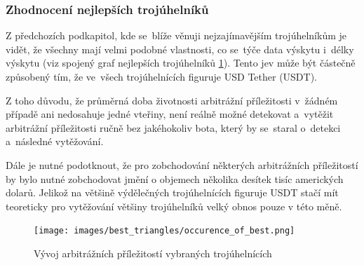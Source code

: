 \documentclass[thesis=B,czech]{FITthesis}[2019/03/21]
\begin{document}
\subsubsection{Zhodnocení nejlepších trojúhelníků}
Z předchozích podkapitol, kde se~blíže věnuji nejzajímavějším trojúhelníkům je vidět, že všechny mají velmi podobné vlastnosti, co se~týče data výskytu i~délky výskytu (viz spojený graf nejlepších trojúhelníků \ref{occurence_of_best}). Tento jev může být částečně způsobený tím, že ve~všech trojúhelnících figuruje USD Tether (USDT). 

Z toho důvodu, že průměrná doba životnosti arbitrážní příležitosti \linebreak v~žádném případě ani nedosahuje jedné vteřiny, není reálně možné detekovat a~vytěžit arbitrážní příležitosti ručně bez jakéhokoliv bota, který by se~staral o~detekci a~následné vytěžování. 

Dále je nutné podotknout, že pro zobchodování některých arbitrážních příležitostí by bylo nutné zobchodovat jmění o objemech několika desítek tisíc amerických dolarů. Jelikož na většině výdělečných trojúhelnících figuruje USDT stačí mít teoreticky pro vytěžování většiny trojúhelníků velký obnos pouze v této měně.

\begin{figure}\centering
	\texttt{[image: images/best\_triangles/occurence\_of\_best.png]}
	\caption{Vývoj arbitrážních příležitostí vybraných trojúhelnících }\label{occurence_of_best}
\end{figure}
\end{document}
